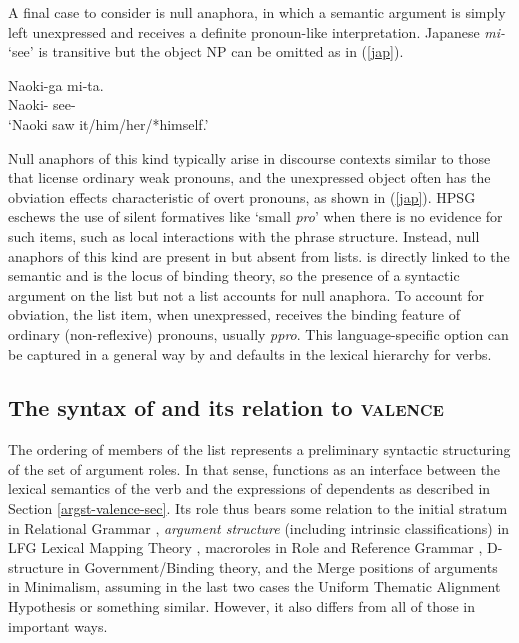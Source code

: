 \documentclass[output=paper
                ,modfonts
                ,nonflat
	        ,collection
	        ,collectionchapter
	        ,collectiontoclongg
 	        ,biblatex
                ,babelshorthands
                ,newtxmath
                ,draftmode
                ,colorlinks, citecolor=brown
]{./langsci/langscibook}
\begin{document}
A final case to consider is null anaphora, in which a semantic argument is simply left unexpressed and receives a definite pronoun-like interpretation.  Japanese \textit{mi-} `see' is transitive but the object NP can be omitted as in (\ref{jap}).

\begin{exe}
	\ex\label{jap}
		\gll Naoki-ga mi-ta.  \\
		Naoki- see-  \\
		\glt `Naoki saw it/him/her/*himself.'
\end{exe} 

\noindent
Null anaphors of this kind typically arise in discourse contexts similar to those that license ordinary weak pronouns, and the unexpressed object often has the obviation effects characteristic of overt pronouns,  as shown in (\ref{jap}).  HPSG eschews the use of silent formatives like `small \textit{pro}' when there is no evidence for such items, such as local interactions with the phrase structure.  Instead, null anaphors of this kind are present in \argst but absent from \val lists.  \argst is directly linked to the semantic \content and is the locus of binding theory, so the presence of a syntactic argument on the \argst list but not a \val list
 accounts for null anaphora.  To account for obviation, the \argst list item, when unexpressed, receives the binding feature of ordinary (non-reflexive) pronouns, usually \textit{ppro}.  This language-specific option can be captured in a general way by \val and \argst defaults in the lexical hierarchy for verbs.   

\subsection{The syntax of \argst and its relation to \textsc{valence}}
\label{argst-sec}


The ordering of members of the \argst list represents a preliminary syntactic structuring of the set of argument roles.  In that sense, \argst functions as an interface between the lexical semantics of the verb and the expressions of dependents as described in Section \ref{argst-valence-sec}.  Its role thus bears some relation to the initial stratum in Relational Grammar \citep{PerlmutterandPostal1984},  \textit{argument structure} (including intrinsic classifications) in LFG Lexical Mapping Theory  \citep{Bresnan+etal:2015}, macroroles in Role and Reference Grammar \citep{VanValinandLapolla1997}, D-structure in Government/Binding theory, and the Merge positions of arguments in Minimalism,  assuming in the last two cases the Uniform Thematic Alignment Hypothesis \citep{Baker1988} or something similar.  However, it also differs from all of those in important ways.  
\end{document}
